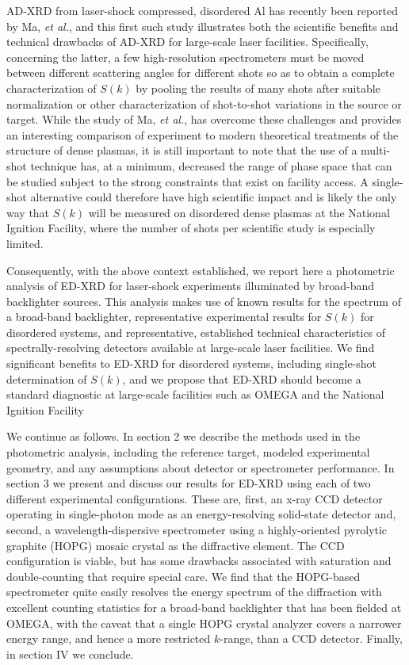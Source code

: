 AD-XRD from laser-shock compressed, disordered Al has recently been
reported by Ma, \emph{et
al.},\hyperref[t.-ma-et-al.-physical-review-letters-110-065001-2013.]\cite{MA2013X}
and this first such study illustrates both the scientific benefits and
technical drawbacks of AD-XRD for large-scale laser facilities.
Specifically, concerning the latter, a few high-resolution spectrometers
must be moved between different scattering angles for different shots so
as to obtain a complete characterization of \(S(k)\) by pooling the
results of many shots after suitable normalization or other
characterization of shot-to-shot variations in the source or target.
While the study of Ma, \emph{et
al.},\hyperref[t.-ma-et-al.-physical-review-letters-110-065001-2013.]\cite{MA2013X}
has overcome these challenges and provides an interesting comparison of
experiment to modern theoretical treatments of the structure of dense
plasmas, it is still important to note that the use of a multi-shot
technique has, at a minimum, decreased the range of phase space that can
be studied subject to the strong constraints that exist on facility
access. A single-shot alternative could therefore have high scientific
impact and is likely the only way that \(S(k)\) will be measured on
disordered dense plasmas at the National Ignition Facility, where the
number of shots per scientific study is especially limited.

Consequently, with the above context established, we report here a
photometric analysis of ED-XRD for laser-shock experiments illuminated
by broad-band backlighter sources. This analysis makes use of known
results for the spectrum of a broad-band backlighter, representative
experimental results for \(S(k)\) for disordered systems, and
representative, established technical characteristics of
spectrally-resolving detectors available at large-scale laser
facilities. We find significant benefits to ED-XRD for disordered
systems, including single-shot determination of \(S(k)\), and we propose
that ED-XRD should become a standard diagnostic at large-scale
facilities such as OMEGA and the National Ignition Facility

We continue as follows. In section 2 we describe the methods used in the
photometric analysis, including the reference target, modeled
experimental geometry, and any assumptions about detector or
spectrometer performance. In section 3 we present and discuss our
results for ED-XRD using each of two different experimental
configurations. These are, first, an x-ray CCD detector operating in
single-photon mode as an energy-resolving solid-state detector and,
second, a wavelength-dispersive spectrometer using a highly-oriented
pyrolytic graphite (HOPG) mosaic crystal as the diffractive element. The
CCD configuration is viable, but has some drawbacks associated with
saturation and double-counting that require special care. We find that
the HOPG-based spectrometer quite easily resolves the energy spectrum of
the diffraction with excellent counting statistics for a broad-band
backlighter that has been fielded at OMEGA, with the caveat that a
single HOPG crystal analyzer covers a narrower energy range, and hence a
more restricted \(k\)-range, than a CCD detector. Finally, in section IV
we conclude.

